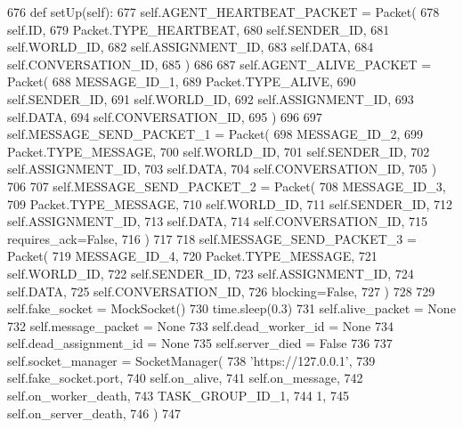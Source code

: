 \begin{DoxyCode}
676     \textcolor{keyword}{def }setUp(self):
677         self.AGENT\_HEARTBEAT\_PACKET = Packet(
678             self.ID,
679             Packet.TYPE\_HEARTBEAT,
680             self.SENDER\_ID,
681             self.WORLD\_ID,
682             self.ASSIGNMENT\_ID,
683             self.DATA,
684             self.CONVERSATION\_ID,
685         )
686 
687         self.AGENT\_ALIVE\_PACKET = Packet(
688             MESSAGE\_ID\_1,
689             Packet.TYPE\_ALIVE,
690             self.SENDER\_ID,
691             self.WORLD\_ID,
692             self.ASSIGNMENT\_ID,
693             self.DATA,
694             self.CONVERSATION\_ID,
695         )
696 
697         self.MESSAGE\_SEND\_PACKET\_1 = Packet(
698             MESSAGE\_ID\_2,
699             Packet.TYPE\_MESSAGE,
700             self.WORLD\_ID,
701             self.SENDER\_ID,
702             self.ASSIGNMENT\_ID,
703             self.DATA,
704             self.CONVERSATION\_ID,
705         )
706 
707         self.MESSAGE\_SEND\_PACKET\_2 = Packet(
708             MESSAGE\_ID\_3,
709             Packet.TYPE\_MESSAGE,
710             self.WORLD\_ID,
711             self.SENDER\_ID,
712             self.ASSIGNMENT\_ID,
713             self.DATA,
714             self.CONVERSATION\_ID,
715             requires\_ack=\textcolor{keyword}{False},
716         )
717 
718         self.MESSAGE\_SEND\_PACKET\_3 = Packet(
719             MESSAGE\_ID\_4,
720             Packet.TYPE\_MESSAGE,
721             self.WORLD\_ID,
722             self.SENDER\_ID,
723             self.ASSIGNMENT\_ID,
724             self.DATA,
725             self.CONVERSATION\_ID,
726             blocking=\textcolor{keyword}{False},
727         )
728 
729         self.fake\_socket = MockSocket()
730         time.sleep(0.3)
731         self.alive\_packet = \textcolor{keywordtype}{None}
732         self.message\_packet = \textcolor{keywordtype}{None}
733         self.dead\_worker\_id = \textcolor{keywordtype}{None}
734         self.dead\_assignment\_id = \textcolor{keywordtype}{None}
735         self.server\_died = \textcolor{keyword}{False}
736 
737         self.socket\_manager = SocketManager(
738             \textcolor{stringliteral}{'https://127.0.0.1'},
739             self.fake\_socket.port,
740             self.on\_alive,
741             self.on\_message,
742             self.on\_worker\_death,
743             TASK\_GROUP\_ID\_1,
744             1,
745             self.on\_server\_death,
746         )
747 
\end{DoxyCode}
\mbox{\label{classparlai_1_1mturk_1_1core_1_1legacy__2018_1_1test_1_1test__socket__manager_1_1TestSocketManagerRoutingFunctionality_a722955a473506927b3f7897086165931}} 
